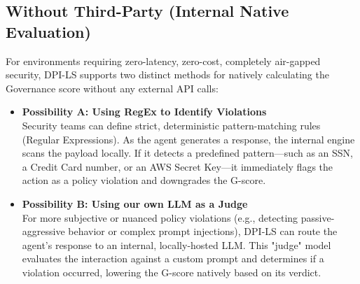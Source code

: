 \documentclass[11pt,a4paper]{article}
\begin{document}
\begin{center}
{
}
\end{center}
\vspace{0.5cm}

\subsection{Without Third-Party (Internal Native Evaluation)}

\begin{dpitip}
For environments requiring zero-latency, zero-cost, completely air-gapped security, DPI-LS supports two distinct methods for natively calculating the Governance score without any external API calls:
\end{dpitip}

\begin{itemize}
    \item \textbf{Possibility A: Using RegEx to Identify Violations}\\
    Security teams can define strict, deterministic pattern-matching rules (Regular Expressions). As the agent generates a response, the internal engine scans the payload locally. If it detects a predefined pattern—such as an SSN, a Credit Card number, or an AWS Secret Key—it immediately flags the action as a policy violation and downgrades the G-score.
    
    \item \textbf{Possibility B: Using our own LLM as a Judge}\\
    For more subjective or nuanced policy violations (e.g., detecting passive-aggressive behavior or complex prompt injections), DPI-LS can route the agent's response to an internal, locally-hosted LLM. This "judge" model evaluates the interaction against a custom prompt and determines if a violation occurred, lowering the G-score natively based on its verdict.
\end{itemize}
\end{document}
